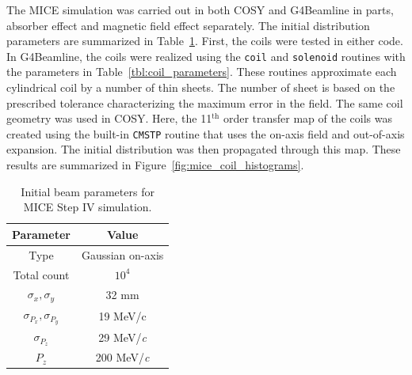 \documentclass{jacow}
\begin{document}
The MICE simulation was carried out in both COSY and G4Beamline in parts, absorber effect and magnetic field effect separately. The initial distribution parameters are summarized in Table~\ref{tbl:initial_distribution}. First, the coils were tested in either code. In G4Beamline, the coils were realized using the \texttt{coil} and \texttt{solenoid} routines with the parameters in Table~\ref{tbl:coil_parameters}. These routines approximate each cylindrical coil by a number of thin sheets. The number of sheet is based on the prescribed tolerance characterizing the maximum error in the field. The same coil geometry was used in COSY. Here, the 11$^\text{th}$ order transfer map of the coils was created using the built-in \texttt{CMSTP} routine that uses the on-axis field and out-of-axis expansion. The initial distribution was then propagated through this map. These results are summarized in Figure~\ref{fig:mice_coil_histograms}.

\begin{table}[!ht]
\begin{center}
\caption{Initial beam parameters for MICE Step IV simulation.}
\begin{tabular}{cc}
	\toprule
	\textbf{Parameter} & \textbf{Value}\\ 
	\midrule
	Type & Gaussian on-axis\\
	Total count & $10^4$\\
	$\sigma_x, \sigma_y$ & 32 mm\\
	$\sigma_{P_x}, \sigma_{P_y}$ & 19 MeV/c\\
	$\sigma_{P_z}$ & 29 MeV/\textit{c} \\
	$P_z$ & 200 MeV/\textit{c} \\
	\bottomrule
\end{tabular}
\label{tbl:initial_distribution}
\end{center}
\end{table}
\end{document}
